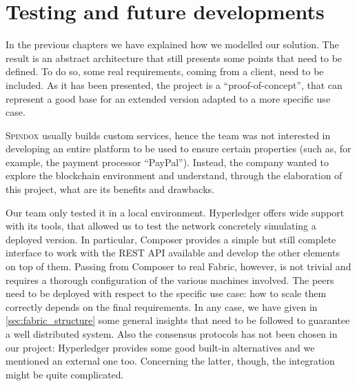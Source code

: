 \chapter{Testing and future developments}
\label{cha:future}

In the previous chapters we have explained how we modelled our solution. The result is an abstract architecture that still presents some points that need to be defined. To do so, some real requirements, coming from a client, need to be included. As it has been presented, the project is a ``proof-of-concept'', that can represent a good base for an extended version adapted to a more specific use case.

\textsc{Spindox} usually builds custom services, hence the team was not interested in developing an entire platform to be used to ensure certain properties (such as, for example, the payment processor ``PayPal''). Instead, the company wanted to explore the blockchain environment and understand, through the elaboration of this project, what are its benefits and drawbacks. 

Our team only tested it in a local environment. Hyperledger offers wide support with its tools, that allowed us to test the network concretely simulating a deployed version. In particular, Composer provides a simple but still complete interface to work with the REST API available and develop the other elements on top of them. Passing from Composer to real Fabric, however, is not trivial and requires a thorough configuration of the various machines involved. The peers need to be deployed with respect to the specific use case: how to scale them correctly depends on the final requirements. In any case, we have given in \ref{sec:fabric_structure} some general insights that need to be followed to guarantee a well distributed system. Also the consensus protocols has not been chosen in our project: Hyperledger provides some good built-in alternatives and we mentioned an external one too. Concerning the latter, though, the integration might be quite complicated.

